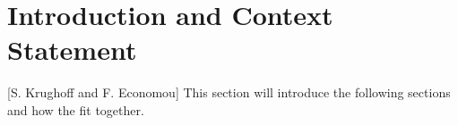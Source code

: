 \section{Introduction and Context Statement} [S. Krughoff and F. Economou]
This section will introduce the following sections and how the fit together.
